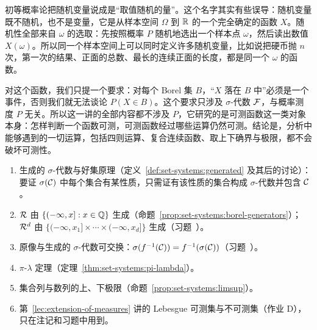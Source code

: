 \label{lec:random-variables}

初等概率论把随机变量说成是“取值随机的量”。这个名字其实有些误导：随机变量既不随机，也不是变量，它是从样本空间 $\Omega$ 到 $\mathbb{R}$ 的一个完全确定的函数 $X$。随机性全部来自 $\omega$ 的选取：先按照概率 $P$ 随机地选出一个样本点 $\omega$，然后读出数值 $X(\omega)$。所以同一个样本空间上可以同时定义许多随机变量，比如说把硬币抛 $n$ 次，第一次的结果、正面的总数、最长的连续正面的长度，都是同一个 $\omega$ 的函数。

对这个函数，我们只提一个要求：对每个 Borel 集 $B$，“$X$ 落在 $B$ 中”必须是一个事件，否则我们就无法谈论 $P(X\in B)$。这个要求只涉及 $\sigma$-代数 $\mathcal{F}$，与概率测度 $P$ 无关。所以这一讲的全部内容都不涉及 $P$，它研究的是可测函数这一类对象本身：怎样判断一个函数可测，可测函数经过哪些运算仍然可测。结论是，分析中能够遇到的一切运算，包括四则运算、复合连续函数、取上下确界与极限，都不会破坏可测性。


\begin{enumerate}
\item 生成的 $\sigma$-代数与好集原理（定义~\ref{def:set-systems:generated} 及其后的讨论）：要证 $\sigma(\mathcal{C})$ 中每个集合有某性质，只需证有该性质的集合构成 $\sigma$-代数并包含 $\mathcal{C}$。
\item $\mathcal{R}$ 由 $\{(-\infty,x]:x\in\mathbb{Q}\}$ 生成（命题~\ref{prop:set-systems:borel-generators}）；$\mathcal{R}^d$ 由 $\{(-\infty,x_1]\times\cdots\times(-\infty,x_d]\}$ 生成（习题~）。
\item 原像与生成的 $\sigma$-代数可交换：$\sigma(f^{-1}(\mathcal{C}))=f^{-1}(\sigma(\mathcal{C}))$（习题~）。
\item $\pi$-$\lambda$ 定理（定理~\ref{thm:set-systems:pi-lambda}）。
\item 集合列与数列的上、下极限（命题~\ref{prop:set-systems:limsup}）。
\item 第~\ref{lec:extension-of-measures} 讲的 Lebesgue 可测集与不可测集（作业 D），只在注记和习题中用到。
\end{enumerate}

